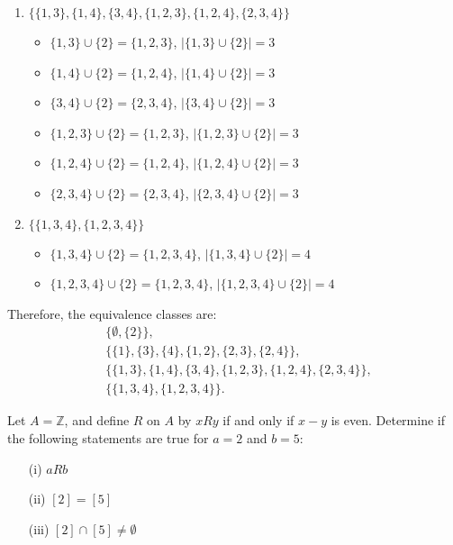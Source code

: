 \begin{solution}
\begin{enumerate}[label=\textbf{Class \arabic*:}, itemsep=10pt]
\item $\{\{1, 3\}, \{1, 4\}, \{3, 4\}, \{1, 2, 3\}, \{1, 2, 4\}, \{2, 3, 4\}\}$
    \begin{itemize}
    \item $\{1, 3\} \cup \{2\} = \{1, 2, 3\}$, $|\{1, 3\} \cup \{2\}| = 3$
    \item $\{1, 4\} \cup \{2\} = \{1, 2, 4\}$, $|\{1, 4\} \cup \{2\}| = 3$
    \item $\{3, 4\} \cup \{2\} = \{2, 3, 4\}$, $|\{3, 4\} \cup \{2\}| = 3$
    \item $\{1, 2, 3\} \cup \{2\} = \{1, 2, 3\}$, $|\{1, 2, 3\} \cup \{2\}| = 3$
    \item $\{1, 2, 4\} \cup \{2\} = \{1, 2, 4\}$, $|\{1, 2, 4\} \cup \{2\}| = 3$
    \item $\{2, 3, 4\} \cup \{2\} = \{2, 3, 4\}$, $|\{2, 3, 4\} \cup \{2\}| = 3$
    \end{itemize}

\item $\{\{1, 3, 4\}, \{1, 2, 3, 4\}\}$
    \begin{itemize}
    \item $\{1, 3, 4\} \cup \{2\} = \{1, 2, 3, 4\}$, $|\{1, 3, 4\} \cup \{2\}| = 4$
    \item $\{1, 2, 3, 4\} \cup \{2\} = \{1, 2, 3, 4\}$, $|\{1, 2, 3, 4\} \cup \{2\}| = 4$
    \end{itemize}

\end{enumerate}

Therefore, the equivalence classes are:
\[
\begin{aligned}
&\{\emptyset, \{2\}\}, \\
&\{\{1\}, \{3\}, \{4\}, \{1, 2\}, \{2, 3\}, \{2, 4\}\}, \\
&\{\{1, 3\}, \{1, 4\}, \{3, 4\}, \{1, 2, 3\}, \{1, 2, 4\}, \{2, 3, 4\}\}, \\
&\{\{1, 3, 4\}, \{1, 2, 3, 4\}\}.
\end{aligned}
\]
\end{solution}

\begin{exercise}
	Let \( A = \mathbb{Z} \), and define \( R \) on \( A \) by \( xRy \) if and only if \( x - y \) is even. Determine if the following statements are true for \( a = 2 \) and \( b = 5 \):
	\begin{enumerate}
		\item[(i)] \( aRb \)
		\item[(ii)] \( [2] = [5] \)
		\item[(iii)] \( [2] \cap [5] \neq \emptyset \)
	\end{enumerate}
\end{exercise}

